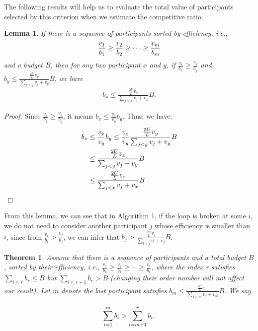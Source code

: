 \documentclass[conference,compsocconf,letterpaper,10pt]{IEEEtran}
\newtheorem{theorem}{Theorem}
\newtheorem{lemma}{Lemma}
\newcommand{\ie}{{\em i.e.}}
\begin{document}
The following results will help us to evaluate the total value of participants selected by this criterion when we estimate the competitive ratio.
\begin{lemma}
If there is a sequence of participants sorted by efficiency, \ie, 
\begin{eqnarray}
\frac{v_1}{b_1} \ge \frac{v_2}{b_2} \ge \cdots \ge \frac{v_m}{b_m} \notag
\end{eqnarray}
 and a budget $B$, then for any two participant $x$ and $y$, if $\frac{v_x}{b_x} \ge \frac{v_y}{b_y}$ and $b_y \le \frac{\frac{2U}{L}v_y}{\sum_{j<y}v_j+v_y}B$, we have
\begin{eqnarray}
b_x \le \frac{\frac{2U}{L}v_x}{\sum_{j<x}v_j+v_x}B.
\end{eqnarray}
\end{lemma}

\begin{proof}
Since $\frac{v_x}{b_x} \ge \frac{v_y}{b_y}$, it means $b_x \le \frac{v_x}{v_y}b_y$. Thus, we have:
\begin{align}
b_x&\le \frac{v_x}{v_y}b_y  \le \frac{v_x}{v_y}\frac{\frac{2U}{L}v_y}{\sum_{j<y}v_j+v_y}B\notag\\
&\le \frac{\frac{2U}{L}v_x}{\sum_{j<y}v_j+v_y}B \notag\\
&\le \frac{\frac{2U}{L}v_x}{\sum_{j<x}v_j+v_x}B\notag
\end{align}




\end{proof}
From this lemma, we can see that in Algorithm 1, if the loop is broken at some $i$, we do not need to consider another participant $j$ whose efficiency is smaller than $i$, since from $\frac{v_i}{b_i} > \frac{v_j}{b_j}$, we can infer that $b_j > \frac{\frac{2U}{L}v_j}{\sum_{l<j}v_l+v_j}B$.
\begin{theorem}Assume that there is a sequence of participants and a total budget $B$, sorted by their efficiency, \ie, $\frac{v_1}{b_1} \ge \frac{v_2}{b_2} \ge \cdots \ge \frac{v_r}{b_r}$, where the index r satisfies $\sum_{i \le r} b_r \le B$ but $\sum_{i \le r+1} b_r > B $ (changing their order number will not affect our result). Let $m$ denote the last participant satisfies $b_m \le \frac{\frac{2U}{L}v_m}{\sum_{j<m}v_j+v_m}B$. We say
\begin{small}
\begin{eqnarray}
\sum_{i=1}^{m} b_i > \sum_{i=m+1}^{r}b_i. \notag
\end{eqnarray}
\end{small}
\end{theorem}
\end{document}
